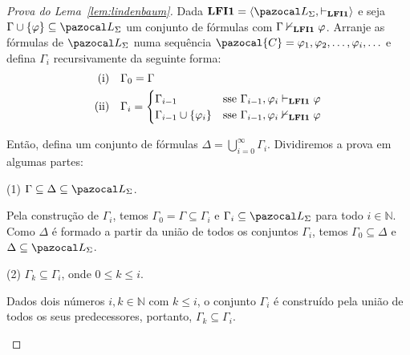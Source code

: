     \begin{proof}[Prova do Lema~\ref{lem:lindenbaum}]
        Dada $\lfium{} = \langle \ling, \conhil \rangle$ e seja $\Gamma \cup \{\phi\} \subseteq \ling$ um conjunto de fórmulas com $\Gamma \nvdash_{{\normalfont\textbf{LFI1}}{}} \varphi$. Arranje      as fórmulas de $\ling$ numa sequência $\pazocal{C} = \phi_1, \phi_2, \ldots, \phi_i, \ldots$ e defina $\Gamma_i$ recursivamente da seguinte forma:
        \begin{align*}
                \text{(i)}\quad&\Gamma_0 = \Gamma\\
                \text{(ii)}\quad&\Gamma_i =
                \begin{cases}
                    \Gamma_{i - 1} &\text{sse}~ \Gamma_{i - 1}, \varphi_i \vdash_{{\normalfont\textbf{LFI1}}{}} \varphi\\
                    \Gamma_{i - 1} \cup \{\varphi_i\} &\text{sse}~ \Gamma_{i - 1}, \varphi_i \nvdash_{{\normalfont\textbf{LFI1}}{}} \varphi
                \end{cases}
        \end{align*}

        Então, defina um conjunto de fórmulas $\Delta = \bigcup_{i=0}^{\infty}\Gamma_i$. Dividiremos a prova em algumas partes:
        
        \begin{adjustwidth}{1cm}{}
            \noindent(1) $\Gamma \subseteq \Delta \subseteq \ling$.

            \begin{adjustwidth}{1cm}{}
                Pela construção de $\Gamma_i$, temos $\Gamma_0 = \Gamma \subseteq \Gamma_i$ e $\Gamma_i \subseteq \ling$ para todo $i \in \mathbb{N}$. Como $\Delta$ é formado a partir da união de todos os conjuntos $\Gamma_i$, temos $\Gamma_0 \subseteq \Delta$ e $\Delta \subseteq \ling$.
            \end{adjustwidth}

            \noindent(2) $\Gamma_k \subseteq \Gamma_i$, onde $0 \leq k \leq i$.

            \begin{adjustwidth}{1cm}{}
                Dados dois números $i, k \in \mathbb{N}$ com $k \leq i$, o conjunto $\Gamma_i$ é construído pela união de todos os seus predecessores, portanto, $\Gamma_k \subseteq \Gamma_i$.
                

\end{adjustwidth}
\end{adjustwidth}
\end{proof}
